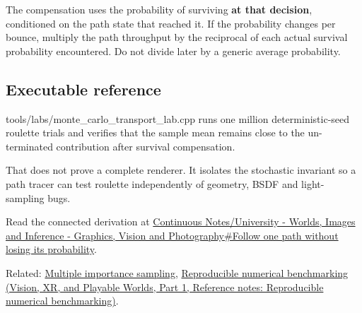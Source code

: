 \hypertarget{appendix-7277c62d4599-conditional-probability-matters}{}

The compensation uses the probability of surviving \textbf{at that decision}, conditioned on the path state that reached it. If the probability changes per bounce, multiply the path throughput by the reciprocal of each actual survival probability encountered. Do not divide later by a generic average probability.

\subsection{Executable reference}\label{appendix-7277c62d4599-executable-reference}

\hypertarget{appendix-7277c62d4599-executable-reference}{}

tools/labs/monte\_carlo\_transport\_lab.cpp runs one million deterministic-seed roulette trials and verifies that the sample mean remains close to the un-terminated contribution after survival compensation.

That does not prove a complete renderer. It isolates the stochastic invariant so a path tracer can test roulette independently of geometry, BSDF and light-sampling bugs.

Read the connected derivation at \hyperref[03-visual-computing-i-ch007-follow-one-path-without-losing-its-probability]{Continuous Notes/University - Worlds, Images and Inference - Graphics, Vision and Photography\#Follow one path without losing its probability}.

Related: \hyperref[appendix-ca8898faf1a6]{Multiple importance sampling}, \href{../07-Vision-XR-and-Playable-Worlds-P01/main.pdf\#appendix-b9db93e28371}{Reproducible numerical benchmarking (Vision, XR, and Playable Worlds, Part 1, Reference notes: Reproducible numerical benchmarking)}.
